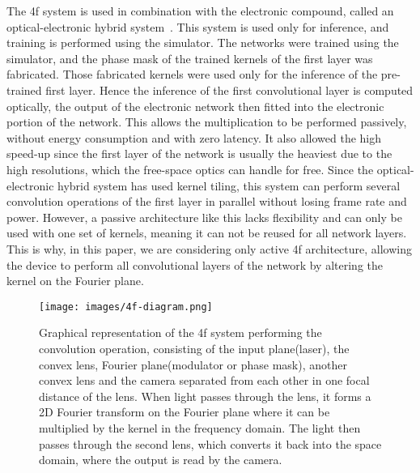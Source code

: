 \documentclass{article}
\begin{document}
The 4f system is used in combination with the electronic compound, called an optical-electronic hybrid system~\cite{chang_hybrid_2018}. This system is used only for inference, and training is performed using the simulator. The networks were trained using the simulator, and the phase mask of the trained kernels of the first layer was fabricated. Those fabricated kernels were used only for the inference of the pre-trained first layer. Hence the inference of the first convolutional layer is computed optically, the output of the electronic network then fitted into the electronic portion of the network. This allows the multiplication to be performed passively, without energy consumption and with zero latency. It also allowed the high speed-up since the first layer of the network is usually the heaviest due to the high resolutions, which the free-space optics can handle for free. Since the optical-electronic hybrid system has used kernel tiling, this system can perform several convolution operations of the first layer in parallel without losing frame rate and power. However, a passive architecture like this lacks flexibility and can only be used with one set of kernels, meaning it can not be reused for all network layers. This is why, in this paper, we are considering only active 4f architecture, allowing the device to perform all convolutional layers of the network by altering the kernel on the Fourier plane. 

\begin{figure}[H]
\centering
\texttt{[image: images/4f-diagram.png]}
\caption{Graphical representation of the 4f system performing the convolution operation, consisting of the input plane(laser), the convex lens, Fourier plane(modulator or phase mask), another convex lens and the camera separated from each other in one focal distance of the lens. When light passes through the lens, it forms a 2D Fourier transform on the Fourier plane where it can be multiplied by the kernel in the frequency domain. The light then passes through the second lens, which converts it back into the space domain, where the output is read by the camera.
\label{fig1}}

\end{figure}   
\end{document}
